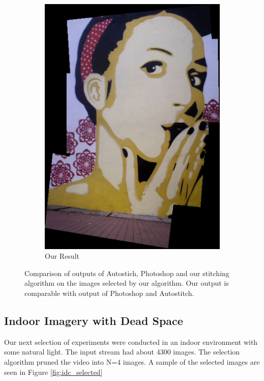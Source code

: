 \begin{figure}
\begin{subfigure}[b]{0.3\textwidth}
\includegraphics[width=\linewidth]{figures/sac3/our_result.jpg}
\caption{Our Result}
\end{subfigure}
\caption{Comparison of outputs of Autostich, Photoshop and our stitching
algorithm on the images selected by our algorithm. Our output is comparable
with output of Photoshop and Autostitch.}
\label{fig:results_sac3}
\end{figure}

\subsection{Indoor Imagery with Dead Space} 

Our next selection of experiments were conducted in an indoor
environment with some natural light.  The input stream had about 4300
images. The selection algorithm pruned the video into N=4 images. A sample of the selected images are
seen in Figure \ref{fig:idc_selected}


